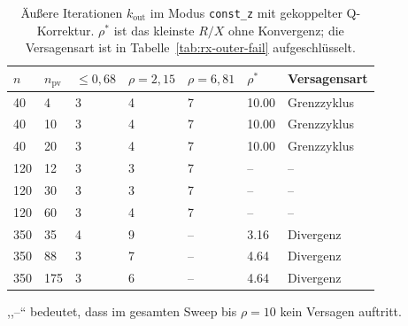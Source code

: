 \begin{table}[htbp]
\centering
\caption{\"Au\ss ere Iterationen $k_{\mathrm{out}}$ im Modus \texttt{const\_z} mit gekoppelter Q-Korrektur. $\rho^\ast$ ist das kleinste $R/X$ ohne Konvergenz; die Versagensart ist in Tabelle~\ref{tab:rx-outer-fail} aufgeschl\"usselt.}
\label{tab:rx-outer}
\begin{tabular}{lllllll}
\toprule
$n$ & $n_\mathrm{pv}$ & $\le0{,}68$ & $\rho=2{,}15$ & $\rho=6{,}81$ & $\rho^\ast$ & Versagensart \\
\midrule
40 & 4 & 3 & 4 & 7 & 10.00 & Grenzzyklus \\
40 & 10 & 3 & 4 & 7 & 10.00 & Grenzzyklus \\
40 & 20 & 3 & 4 & 7 & 10.00 & Grenzzyklus \\
120 & 12 & 3 & 3 & 7 & {--} & {--} \\
120 & 30 & 3 & 3 & 7 & {--} & {--} \\
120 & 60 & 3 & 4 & 7 & {--} & {--} \\
350 & 35 & 4 & 9 & {--} & 3.16 & Divergenz \\
350 & 88 & 3 & 7 & {--} & 4.64 & Divergenz \\
350 & 175 & 3 & 6 & {--} & 4.64 & Divergenz \\
\bottomrule
\end{tabular}

\smallskip
\footnotesize
\raggedright
,,--`` bedeutet, dass im gesamten Sweep bis $\rho=10$ kein Versagen auftritt.
\end{table}
